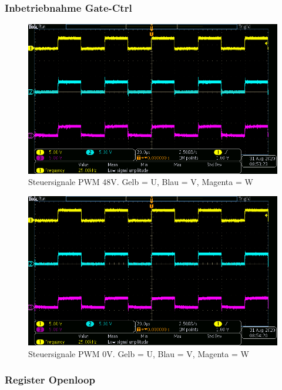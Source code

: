 \newpage

\subsubsection{Inbetriebnahme Gate-Ctrl}\label{Appendix:TMC4671_Gate_Ctrl}

\begin{figure}[H]
\center
\includegraphics[width = \textwidth]{graphics/TMC4671_Gate_Signal_H}
\caption{Steuersignale PWM 48V. Gelb = U, Blau = V, Magenta = W}
\label{fig:TMC4671_Gate_Signal_H}
\end{figure}

\begin{figure}[H]
\center
\includegraphics[width = \textwidth]{graphics/TMC4671_Gate_Signal_L}
\caption{Steuersignale PWM 0V. Gelb = U, Blau = V, Magenta = W}
\label{fig:TMC4671_Gate_Signal_L}
\end{figure}


\subsubsection{Register Openloop}\label{Appendix:TMC4671_Register}

